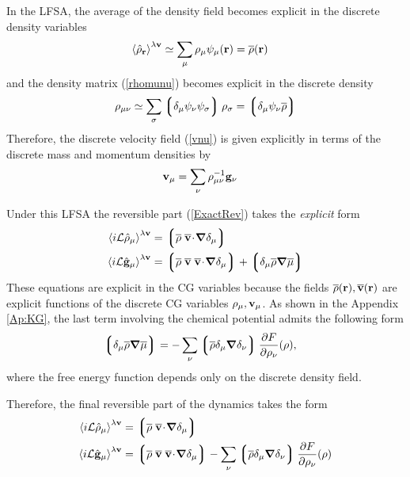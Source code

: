 \documentclass[b5paper,openright,10pt]{book}
\newcommand{\esc}{\!\cdot\!}
\newcommand{\llangle}{\left\langle}
\newcommand{\rrangle}{\right\rangle}
\newcommand{\llg}{\left\lgroup}
\newcommand{\rlg}{\right\rgroup}
\begin{document}
In the LFSA, the average of the density field becomes explicit
in the discrete density variables
\begin{align}
  \llangle \hat{\rho}_{\bf r}\rrangle^{\lambda{\bf v}}&\simeq
\sum_\mu\rho_\mu\psi_\mu({\bf r})=\overline{\rho}({\bf r})
\end{align}
and the density matrix (\ref{rhomunu}) becomes explicit in the discrete density 
\begin{align}
  \rho_{\mu\nu} \simeq \sum_\sigma\llg\delta_\mu\psi_\nu\psi_\sigma\rlg\rho_\sigma
=\llg\delta_\mu\psi_\nu\overline{\rho}\rlg
\label{calR1}
\end{align}
Therefore, the discrete velocity  field (\ref{vnu}) is given explicitly
in terms of the discrete mass and momentum densities by
\begin{align}
{\bf v}_\mu&=\sum_\nu\rho^{-1}_{\mu\nu}{\bf g}_\nu
\label{un}
\end{align}

Under this  LFSA the reversible  part (\ref{ExactRev}) takes
the \textit{explicit} form
\begin{align}
  \llangle i{\cal L}  \hat{\rho}_{\mu}\rrangle^{\lambda{\bf v}}&= 
\llg \overline{\rho}\;\overline{\bf v}\esc\boldsymbol{\nabla}\delta_\mu\rlg
\nonumber\\
\llangle i{\cal L}  \hat{\bf g}_{\mu}\rrangle^{\lambda{\bf v}} &=
\llg\overline{\rho}\;\overline{\bf v}\;\overline{\bf v}\esc\boldsymbol{\nabla}\delta_{\mu}\rlg
+\llg\delta_\mu\overline{\rho}\boldsymbol{\nabla}\overline{\mu}\rlg
\label{RevDis0}
\end{align}
These equations  are explicit in  the CG variables because  the fields
$\overline{\rho}({\bf  r}),\overline{\bf  v}({\bf  r})$  are  explicit
functions  of the  discrete CG  variables $\rho_\mu,{\bf  v}_\mu$.  As
shown  in  the  Appendix  \ref{Ap:KG}, the  last  term  involving  the
chemical potential admits the following form
\begin{align}
  \llg\delta_\mu\overline{\rho}\boldsymbol{\nabla}\overline{\mu}\rlg&=
-\sum_\nu\llg\overline{\rho}\delta_{\mu}\boldsymbol{\nabla}\delta_{\nu}\rlg
\frac{\partial  F}{\partial \rho_{\nu}}(\rho),
\end{align}
where the free energy function depends only on the discrete density field.

Therefore, the final reversible part of the dynamics takes the form 
\begin{align}
  \llangle i{\cal L}  \hat{\rho}_{\mu}\rrangle^{\lambda{\bf v}}&= 
\llg \overline{\rho}\;\overline{\bf v}\esc\boldsymbol{\nabla}\delta_\mu\rlg
\nonumber\\
\llangle i{\cal L}  \hat{\bf g}_{\mu}\rrangle^{\lambda{\bf v}} &=
\llg\overline{\rho}\;\overline{\bf v}\;\overline{\bf v}\esc\boldsymbol{\nabla}\delta_{\mu}\rlg
-\sum_\nu\llg\overline{\rho}\delta_{\mu}\boldsymbol{\nabla}\delta_{\nu}\rlg
\frac{\partial  F}{\partial \rho_{\nu}}(\rho)
\label{RevDis}
\end{align}
\end{document}
